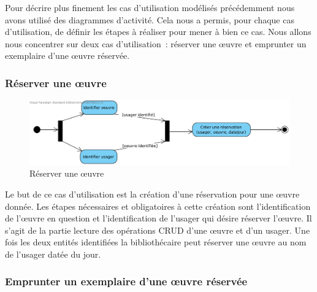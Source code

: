 \documentclass[a4paper,12pt]{article}
\begin{document}
Pour décrire plus finement les cas d’utilisation modélisés précédemment nous
avons utilisé des diagrammes d’activité. Cela nous a permis, pour chaque cas
d’utilisation, de définir les étapes à réaliser pour mener à bien ce cas. Nous
allons nous concentrer sur deux cas d’utilisation : réserver une œuvre et
emprunter un exemplaire d’une œuvre réservée.


\subsubsection{Réserver une œuvre}
\label{sec:orgheadline4}
\begin{figure}[htb]
\centering
\includegraphics[width=.9\linewidth]{./res/img/reserver-oeuvre1.png}
\caption{\label{fig:orgparagraph2}
Réserver une œuvre}
\end{figure}

Le but de ce cas d’utilisation est la création d’une réservation pour
une œuvre donnée. Les étapes nécessaires et obligatoires à cette création
sont l’identification de l’œuvre en question et l’identification de l’usager
qui désire réserver l’œuvre. Il s’agit de la partie lecture des opérations
CRUD d’une œuvre et d’un usager.
Une fois les deux entités identifiées la bibliothécaire peut réserver une
œuvre au nom de l’usager datée du jour.

\clearpage

\subsubsection{Emprunter un exemplaire d’une œuvre réservée}
\label{sec:orgheadline5}
\end{document}
